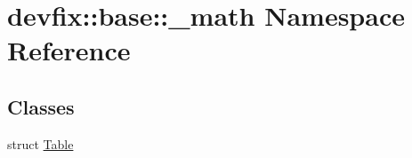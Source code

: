 \hypertarget{namespacedevfix_1_1base_1_1__math}{}\section{devfix\+:\+:base\+:\+:\+\_\+math Namespace Reference}
\label{namespacedevfix_1_1base_1_1__math}
\subsection*{Classes}
\begin{DoxyCompactItemize}
\item 
struct \hyperlink{structdevfix_1_1base_1_1__math_1_1Table}{Table}
\end{DoxyCompactItemize}
